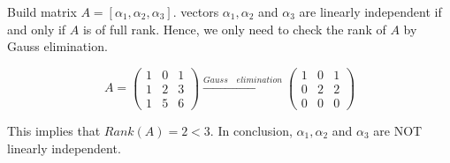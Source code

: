 \documentclass[12pt]{article}
\begin{document}
Build matrix $A = [\alpha_1, \alpha_2, \alpha_3]$. vectors $\alpha_1, \alpha_2$ and $\alpha_3$ are linearly independent if and only if $A$ is of full rank. Hence, we only need to check the rank of $A$ by Gauss elimination.

$$
A = \begin{pmatrix}
1 & 0 & 1 \\
1 & 2 & 3 \\
1 & 5 & 6
\end{pmatrix} \xrightarrow {Gauss \quad elimination}
\begin{pmatrix}
1 & 0 & 1 \\
0 & 2 & 2 \\
0 & 0 & 0
\end{pmatrix}
$$

This implies that $Rank(A) = 2 < 3$. In conclusion, $\alpha_1, \alpha_2$ and $\alpha_3$ are NOT linearly independent.
\end{document}
